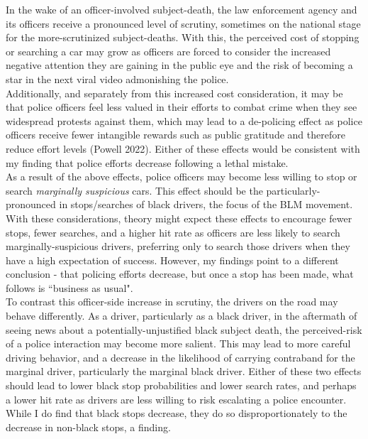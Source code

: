 \documentclass[12pt,a4paper]{article}
\begin{document}
In the wake of an officer-involved subject-death, the law enforcement agency and its officers receive a pronounced level of scrutiny, sometimes on the national stage for the more-scrutinized subject-deaths. With this, the perceived cost of stopping or searching a car may grow as officers are forced to consider the increased negative attention they are gaining in the public eye and the risk of becoming a star in the next viral video admonishing the police. \\

Additionally, and separately from this increased cost consideration, it may be that police officers feel less valued in their efforts to combat crime when they see widespread protests against them, which may lead to a de-policing effect as police officers receive fewer intangible rewards such as public gratitude and therefore reduce effort levels (Powell 2022). Either of these effects would be consistent with my finding that police efforts decrease following a lethal mistake. \\

As a result of the above effects, police officers may become less willing to stop or search \emph{marginally suspicious} cars. This effect should be the particularly-pronounced in stops/searches of black drivers, the focus of the BLM movement. With these considerations, theory might expect these effects to encourage fewer stops, fewer searches, and a higher hit rate as officers are less likely to search marginally-suspicious drivers, preferring only to search those drivers when they have a high expectation of success. However, my findings point to a different conclusion - that policing efforts decrease, but once a stop has been made, what follows is ``business as usual". \\

To contrast this officer-side increase in scrutiny, the drivers on the road may behave differently. As a driver, particularly as a black driver, in the aftermath of seeing news about a potentially-unjustified black subject death, the perceived-risk of a police interaction may become more salient. This may lead to more careful driving behavior, and a decrease in the likelihood of carrying contraband for the marginal driver, particularly the marginal black driver. Either of these two effects should lead to lower black stop probabilities and lower search rates, and perhaps a lower hit rate as drivers are less willing to risk escalating a police encounter. While I do find that black stops decrease, they do so disproportionately to the decrease in non-black stops, a finding. \\
\end{document}
